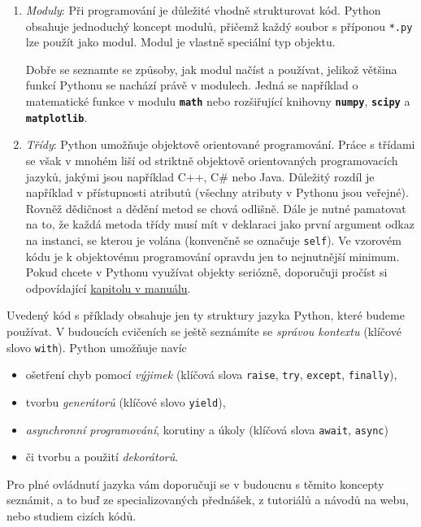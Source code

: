 \documentclass[a4paper,11pt,twoside]{article}
\def\code#1{\textnormal{\texttt{#1}}}
\def\file#1{\textnormal{\textbf{\texttt{#1}}}}
\theoremstyle{red}
\theoremstyle{green}
\begin{document}
\begin{enumerate}
        \item 
            \emph{Moduly}: Při programování je důležité vhodně strukturovat kód.
            Python obsahuje jednoduchý koncept modulů, přičemž každý soubor s příponou \code{*.py} lze použít jako modul.
            Modul je vlastně speciální typ objektu.

            Dobře se seznamte se způsoby, jak modul načíst a používat, jelikož většina funkcí Pythonu se nachází právě v modulech.
            Jedná se například o matematické funkce v modulu \file{math} nebo rozšiřující knihovny \file{numpy}, \file{scipy} a \file{matplotlib}.

        \item 
            \emph{Třídy}: Python umožňuje objektově orientované programování.
            Práce s třídami se však v mnohém liší od striktně objektově orientovaných programovacích jazyků, jakými jsou například C++, C\# nebo Java.
            Důležitý rozdíl je například v přístupnosti atributů (všechny atributy v Pythonu jsou veřejné).
            Rovněž dědičnost a dědění metod se chová odlišně.
            Dále je nutné pamatovat na to, že každá metoda třídy musí mít v deklaraci jako první argument odkaz na instanci, se kterou je volána (konvenčně se označuje \code{self}).
            Ve vzorovém kódu je k objektovému programování opravdu jen to nejnutnější minimum.
            Pokud chcete v Pythonu využívat objekty seriózně, doporučuji pročíst si odpovídající \href{https://docs.python.org/3/tutorial/classes.html}{kapitolu v manuálu}.
    \end{enumerate}

    Uvedený kód s příklady obsahuje jen ty struktury jazyka Python, které budeme používat.
    V budoucích cvičeních se ještě seznámíte se \emph{správou kontextu} (klíčové slovo \code{with}).
    Python umožňuje navíc 
    \begin{itemize}
        \item ošetření chyb pomocí \emph{výjimek} (klíčová slova \code{raise}, \code{try}, \code{except}, \code{finally}),
        \item tvorbu \emph{generátorů} (klíčové slovo \code{yield}),
        \item \emph{asynchronní programování}, korutiny a úkoly (klíčová slova \code{await}, \code{async})
        \item či tvorbu a použití \emph{dekorátorů}.
    \end{itemize}
    Pro plné ovládnutí jazyka vám doporučuji se v budoucnu s těmito koncepty seznámit, a to buď ze specializovaných přednášek, z tutoriálů a návodů na webu, nebo studiem cizích kódů.
\end{document}
